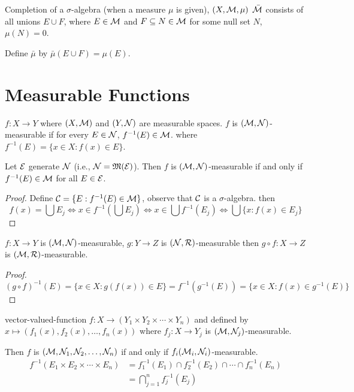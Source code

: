 
Completion of a $\sigma$-algebra (when a measure $\mu$ is given), $(X, \mathcal M, \mu)$ $\bar{\mathcal M}$ consists
of all unions $E \cup F$, where $E \in \mathcal M$ and $F \subseteq N \in \mathcal M$ for some null set $N$, $\mu(N) = 0$.

Define $\bar{\mu}$ by $\bar{\mu}(E \cup F) = \mu(E)$.

\section{Measurable Functions}


\begin{definition}
  $f: X \to Y$ where $(X, \mathcal M)$ and $(Y, \mathcal N)$ are measurable spaces.
  $f$ is $(\mathcal M, \mathcal N)$-measurable if for every $E \in \mathcal N$, $f^{-1}(E) \in \mathcal M$.
  where $f^{-1}(E) = \{x \in X : f(x) \in E\}$.
\end{definition}

\begin{lemma}
  Let $\mathcal E$ generate $\mathcal N$ (i.e., $\mathcal N = \mathfrak M(\mathcal E)$). 
  Then $f$ is $(\mathcal M, \mathcal N)$-measurable if and only if $f^{-1}(E) \in \mathcal M$ for all $E \in \mathcal E$. 
\end{lemma}

\begin{proof}
  Define $\mathcal C = \{E : f^{-1}(E) \in \mathcal M\}$, observe that $\mathcal C$ is a $\sigma$-algebra. then
  \[f(x) = \bigcup E_j \iff x \in f^{-1}\left(\bigcup E_j\right) \iff x \in \bigcup f^{-1}(E_j) \iff \bigcup\{x  : f(x) \in E_j\}\]
\end{proof}

\begin{claim}
$f: X \to Y$ is $(\mathcal M, \mathcal N)$-measurable, $g: Y \to Z$ is $(\mathcal N, \mathcal R)$-measurable then $g \circ f: X \to Z$ is $(\mathcal M, \mathcal R)$-measurable.
\end{claim}
\begin{proof}
  $(g \circ f)^{-1}(E) = \{x \in X : g(f(x)) \in E\} = f^{-1}(g^{-1}(E)) = \{x \in X: f(x) \in g^{-1}(E)\}$
\end{proof}

vector-valued-function
$f: X \to (Y_1 \times Y_2 \times \dotsm \times Y_n)$ and defined by 
$x \mapsto (f_1(x), f_2(x), \dotsc, f_n(x))$ where $f_j: X \to Y_j$ is $(\mathcal M, \mathcal N_j)$-measurable.

Then $f$ is $(\mathcal M, \mathcal N_1, \mathcal N_2, \dotsc,\mathcal N_n)$ if and only if $f_i(\mathcal M_i, \mathcal N_i)$-measurable.
\begin{align*}
  f^{-1}(E_1 \times E_2 \times \dotsm \times E_n) &= f_1^{-1}(E_1) \cap f_2^{-1}(E_2) \cap \dotsm \cap f_n^{-1}(E_n) \\
  &= \bigcap_{j=1}^n f_j^{-1}(E_j)
\end{align*}

